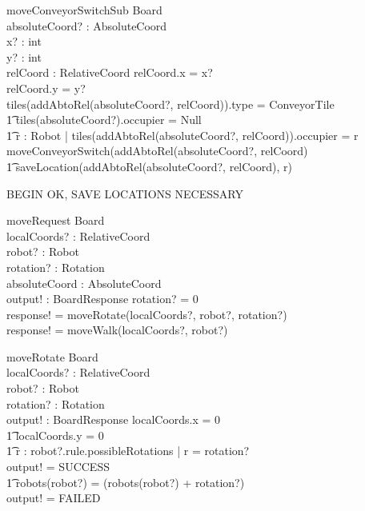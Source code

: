 \documentclass[a4paper,11pt]{article}
\begin{document}
\begin{schema}{moveConveyorSwitchSub}
\Delta Board \\
absoluteCoord? : AbsoluteCoord \\
x? : int \\
y? : int \\
relCoord : RelativeCoord
\where
relCoord.x = x? \\
relCoord.y = y? \\
\IF tiles(addAbtoRel(absoluteCoord?, relCoord)).type = ConveyorTile \\ \t1
tiles(absoluteCoord?).occupier = Null \\ \t1
\exists r : Robot | tiles(addAbtoRel(absoluteCoord?, relCoord)).occupier = r \\
\THEN moveConveyorSwitch(addAbtoRel(absoluteCoord?, relCoord)\\ \t1
saveLocation(addAbtoRel(absoluteCoord?, relCoord), r)
\end{schema}

BEGIN OK, SAVE LOCATIONS NECESSARY
\begin{schema}{moveRequest}
\Delta Board \\
localCoords? : RelativeCoord \\
robot? : Robot \\
rotation? : Rotation \\
absoluteCoord : AbsoluteCoord \\
output! : BoardResponse
\where
\IF rotation? \not = 0 \\
\THEN response! = moveRotate(localCoords?, robot?, rotation?) \\
\ELSE response! = moveWalk(localCoords?, robot?)
\end{schema}

\begin{schema}{moveRotate}
\Delta Board \\
localCoords? : RelativeCoord \\
robot? : Robot \\
rotation? : Rotation \\
output! : BoardResponse
\where
\IF localCoords.x = 0 \\ \t1
localCoords.y = 0 \\ \t1
 \exists r : robot?.rule.possibleRotations | r = rotation?\\
\THEN output! = SUCCESS \\ \t1
robots(robot?) = (robots(robot?) + rotation?)  \\
\ELSE output! = FAILED
\end{schema}
\end{document}
